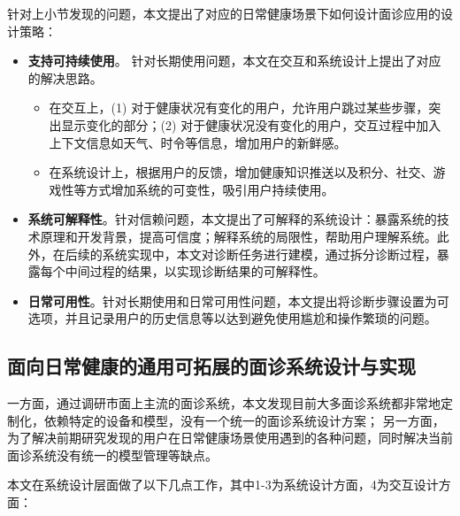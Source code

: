针对上小节发现的问题，本文提出了对应的日常健康场景下如何设计面诊应用的设计策略：
\begin{itemize}
    \item \textbf{支持可持续使用}。
    针对长期使用问题，本文在交互和系统设计上提出了对应的解决思路。
        \begin{itemize}
            \item 在交互上，(1) 对于健康状况有变化的用户，允许用户跳过某些步骤，突出显示变化的部分；(2) 对于健康状况没有变化的用户，交互过程中加入上下文信息如天气、时令等信息，增加用户的新鲜感。
            \item 在系统设计上，根据用户的反馈，增加健康知识推送以及积分、社交、游戏性等方式增加系统的可变性，吸引用户持续使用。
        \end{itemize}
    \item \textbf{系统可解释性}。针对信赖问题，本文提出了可解释的系统设计：暴露系统的技术原理和开发背景，提高可信度；解释系统的局限性，帮助用户理解系统。此外，在后续的系统实现中，本文对诊断任务进行建模，通过拆分诊断过程，暴露每个中间过程的结果，以实现诊断结果的可解释性。
    \item \textbf{日常可用性}。针对长期使用和日常可用性问题，本文提出将诊断步骤设置为可选项，并且记录用户的历史信息等以达到避免使用尴尬和操作繁琐的问题。
\end{itemize}


\subsection{面向日常健康的通用可拓展的面诊系统设计与实现}
一方面，通过调研市面上主流的面诊系统，本文发现目前大多面诊系统都非常地定制化，依赖特定的设备和模型，没有一个统一的面诊系统设计方案；
另一方面，为了解决前期研究发现的用户在日常健康场景使用遇到的各种问题，同时解决当前面诊系统没有统一的模型管理等缺点。

本文在系统设计层面做了以下几点工作，其中1-3为系统设计方面，4为交互设计方面：

